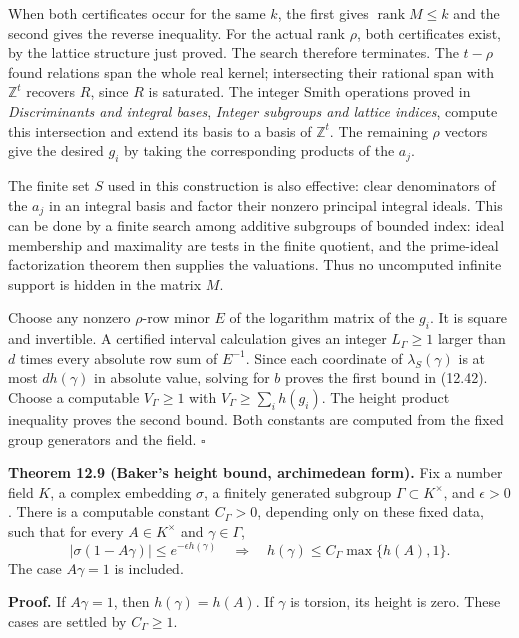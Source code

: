 \documentclass[
  11pt,
  a4paper,
]{article}
\begin{document}
When both certificates occur for the same \(k\), the first gives
\(\operatorname{rank}M\le k\) and the second gives the reverse
inequality. For the actual rank \(\rho\), both certificates exist, by
the lattice structure just proved. The search therefore terminates. The
\(t-\rho\) found relations span the whole real kernel; intersecting
their rational span with \(\mathbb Z^t\) recovers \(R\), since \(R\) is
saturated. The integer Smith operations proved in \emph{Discriminants
and integral bases}, \emph{Integer subgroups and lattice indices},
compute this intersection and extend its basis to a basis of
\(\mathbb Z^t\). The remaining \(\rho\) vectors give the desired \(g_i\)
by taking the corresponding products of the \(a_j\).

The finite set \(S\) used in this construction is also effective: clear
denominators of the \(a_j\) in an integral basis and factor their
nonzero principal integral ideals. This can be done by a finite search
among additive subgroups of bounded index: ideal membership and
maximality are tests in the finite quotient, and the prime-ideal
factorization theorem then supplies the valuations. Thus no uncomputed
infinite support is hidden in the matrix \(M\).

Choose any nonzero \(\rho\)-row minor \(E\) of the logarithm matrix of
the \(g_i\). It is square and invertible. A certified interval
calculation gives an integer \(L_\Gamma\ge1\) larger than \(d\) times
every absolute row sum of \(E^{-1}\). Since each coordinate of
\(\lambda_S(\gamma)\) is at most \(dh(\gamma)\) in absolute value,
solving for \(b\) proves the first bound in (12.42). Choose a computable
\(V_\Gamma\ge1\) with \(V_\Gamma\ge\sum_i h(g_i)\). The height product
inequality proves the second bound. Both constants are computed from the
fixed group generators and the field. \(\square\)

\textbf{Theorem 12.9 (Baker's height bound, archimedean form).} Fix a
number field \(K\), a complex embedding \(\sigma\), a finitely generated
subgroup \(\Gamma\subset K^\times\), and \(\epsilon>0\). There is a
computable constant \(C_\Gamma>0\), depending only on these fixed data,
such that for every \(A\in K^\times\) and \(\gamma\in\Gamma\), \[
|\sigma(1-A\gamma)|\le e^{-\epsilon h(\gamma)}
\quad\Longrightarrow\quad
h(\gamma)\le C_\Gamma\max\{h(A),1\}.
\tag{12.45}
\] The case \(A\gamma=1\) is included.

\textbf{Proof.} If \(A\gamma=1\), then \(h(\gamma)=h(A)\). If \(\gamma\)
is torsion, its height is zero. These cases are settled by
\(C_\Gamma\ge1\).
\end{document}
